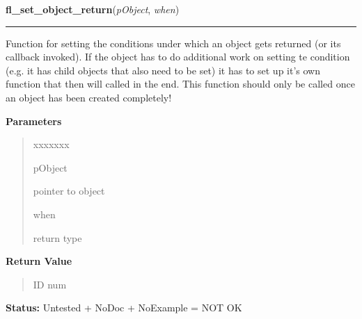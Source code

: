 \hspace{.8\funcindent}\begin{boxedminipage}{\funcwidth}

    \raggedright \textbf{fl\_set\_object\_return}(\textit{pObject}, \textit{when})

    \vspace{-1.5ex}

    \rule{\textwidth}{0.5\fboxrule}
\setlength{\parskip}{2ex}
    Function for setting the conditions under which an object gets returned
    (or its callback invoked). If the object has to do additional work on 
    setting te condition (e.g. it has child objects that also need to be 
    set) it has to set up it's own function that then will called in the 
    end. This function should only be called once an object has been 
    created completely!

\setlength{\parskip}{1ex}
      \textbf{Parameters}
      \vspace{-1ex}

      \begin{quote}
        \begin{Ventry}{xxxxxxx}

          \item[pObject]

          pointer to object

          \item[when]

          return type

        \end{Ventry}

      \end{quote}

      \textbf{Return Value}
    \vspace{-1ex}

      \begin{quote}
      ID num

      \end{quote}

\textbf{Status:} Untested + NoDoc + NoExample = NOT OK



    \end{boxedminipage}

    \label{xformslib:library:fl_notify_object}

    \vspace{0.5ex}

